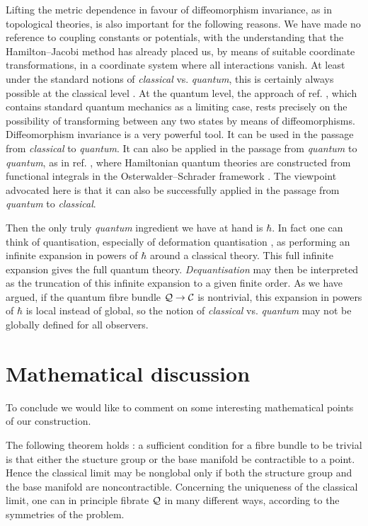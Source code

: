 \documentclass[a4paper,a4paper]{article}
\begin{document}
Lifting the metric dependence in favour of diffeomorphism invariance,
as in topological theories, is also important for the following reasons.
We have made no reference to coupling constants or potentials, with the understanding 
that the Hamilton--Jacobi method has already placed us, by means of suitable coordinate 
transformations, in a coordinate system where all interactions vanish. At least under 
the standard notions \cite{GALINDO} of {\it classical} vs. {\it quantum}, 
this is certainly always possible at the classical level \cite{DR}. At the quantum level, 
the approach of ref. \cite{MATONE}, which contains standard quantum mechanics 
as a limiting case, rests precisely on the possibility of transforming between 
any two states by means of diffeomorphisms. Diffeomorphism invariance is  
a very powerful tool. It can be used \cite{MATONE} in the passage from {\it classical} 
to {\it quantum}. It can also be applied in the passage 
from {\it quantum} to {\it quantum}, as in ref. \cite{MOURAO}, where Hamiltonian quantum 
theories are constructed from functional integrals in the Osterwalder--Schrader framework
\cite{OS, GJ}. The viewpoint advocated here is that it can also 
be successfully applied in the passage from {\it quantum} to {\it classical}.
 
Then the only truly {\it quantum} ingredient we have at hand is $\hbar$. In fact
one can think of quantisation, especially of deformation quantisation 
\cite{STERNHEIMER, ZACHOS}, as 
performing an infinite expansion in powers of $\hbar$ around a classical theory. 
This full infinite expansion gives the full quantum theory. {\it Dequantisation} may then be 
interpreted as the truncation of this infinite expansion to a given finite order.
As we have argued, if the quantum fibre bundle ${\cal Q}\rightarrow {\cal C}$ is nontrivial, 
this expansion in powers of $\hbar$ is local instead of global, so the 
notion of {\it classical} vs. {\it quantum} may not be globally defined for 
all observers.

\section{Mathematical discussion}\label{mathtech}

To conclude we would like to comment on some interesting mathematical 
points of our construction.

The following theorem holds \cite{STEENROD}: a sufficient condition for a fibre bundle 
to be trivial is that either the stucture group or the base manifold be contractible 
to a point. Hence the classical limit may be nonglobal only if both the structure group 
and the base manifold are noncontractible. Concerning the uniqueness of the classical limit, 
one can in principle fibrate ${\cal Q}$ in many different ways, according to the symmetries 
of the problem. 
\end{document}
